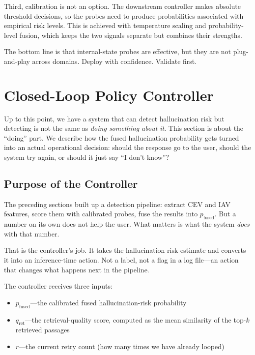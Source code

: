 Third, calibration is not an option. The downstream controller makes absolute threshold decisions, so the probes need to produce probabilities associated with empirical risk levels. This is achieved with temperature scaling and probability-level fusion, which keeps the two signals separate but combines their strengths.

The bottom line is that internal-state probes are effective, but they are not plug-and-play across domains. Deploy with confidence. Validate first.

\newpage
\section{Closed-Loop Policy Controller}
\label{sec:controller}

Up to this point, we have a system that can detect hallucination risk but detecting is not the same as \emph{doing something about it}. This section is about the ``doing'' part. We describe how the fused hallucination probability gets turned into an actual operational decision: should the response go to the user, should the system try again, or should it just say ``I don't know''?

\subsection{Purpose of the Controller}
\label{sec:controller_purpose}

The preceding sections built up a detection pipeline: extract CEV and IAV features, score them with calibrated probes, fuse the results into $p_{\text{fused}}$. But a number on its own does not help the user. What matters is what the system \emph{does} with that number.

That is the controller's job. It takes the hallucination-risk estimate and converts it into an inference-time action. Not a label, not a flag in a log file---an action that changes what happens next in the pipeline.

The controller receives three inputs:
\begin{itemize}
    \item $p_{\text{fused}}$---the calibrated fused hallucination-risk probability
    \item $q_{\text{ret}}$---the retrieval-quality score, computed as the mean similarity of the top-$k$ retrieved passages
    \item $r$---the current retry count (how many times we have already looped)
\end{itemize}

